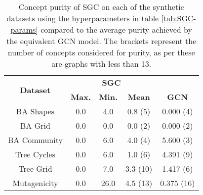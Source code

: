 \begin{table}[h]
    \centering
    \captionsetup{width=.9\textwidth}
    \begin{tabular}{c|ccc|c}
        \multirow{2}{*}{\textbf{Dataset}} &
        \multicolumn{3}{c}{\textbf{SGC}} & \\
        & \textbf{Max.} & \textbf{Min.} & \textbf{Mean} & \multirow{-2}{*}{\textbf{GCN}}\\
        \midrule
        BA Shapes       & 0.0 & 4.0 & 0.8 (5) & 0.000 (4) \\
        BA Grid         & 0.0 & 0.0 & 0.0 (2) & 0.000 (2) \\
        BA Community    & 0.0 & 6.0 & 4.0 (4) & 5.600 (3) \\
        Tree Cycles     & 0.0 & 6.0 & 1.0 (6) & 4.391 (9) \\
        Tree Grid       & 0.0 & 7.0 & 3.3 (10) & 1.417 (6) \\
        \midrule
        Mutagenicity    & 0.0 & 26.0 & 4.5 (13) & 0.375 (16) \\
    \end{tabular}
    \caption{Concept purity of SGC on each of the synthetic datasets using the hyperparameters in table \ref{tab:SGC-params} compared to the average purity achieved by the equivalent GCN model. The brackets represent the number of concepts considered for purity, as per  these are graphs with less than 13.}
    \label{tab:SGC-purity}
\end{table}


